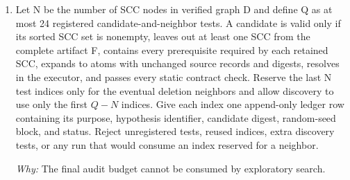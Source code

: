 \documentclass[10pt,a4paper]{article}
\begin{document}
\begin{enumerate}[leftmargin=*,start=4]
\noindent\emph{The SCC projection and inverse form an exact correspondence between dependency-closed atom subsets and downward-closed quotient subsets.}
\par{}
\noindent\emph{Quotienting changes neither the feasible artifact represented by a subset nor its measured task effect.}
\par{}
\par\emph{Why:} The search becomes smaller without changing which executable artifacts can be certified.
  \item Let N be the number of SCC nodes in verified graph D and define Q as at most 24 registered candidate-and-neighbor tests. A candidate is valid only if its sorted SCC set is nonempty, leaves out at least one SCC from the complete artifact F, contains every prerequisite required by each retained SCC, expands to atoms with unchanged source records and digests, resolves in the executor, and passes every static contract check. Reserve the last N test indices only for the eventual deletion neighbors and allow discovery to use only the first \(Q- N\) indices. Give each index one append-only ledger row containing its purpose, hypothesis identifier, candidate digest, random-seed block, and status. Reject unregistered tests, reused indices, extra discovery tests, or any run that would consume an index reserved for a neighbor.
\par\emph{Why:} The final audit budget cannot be consumed by exploratory search.
\end{enumerate}
\end{document}
